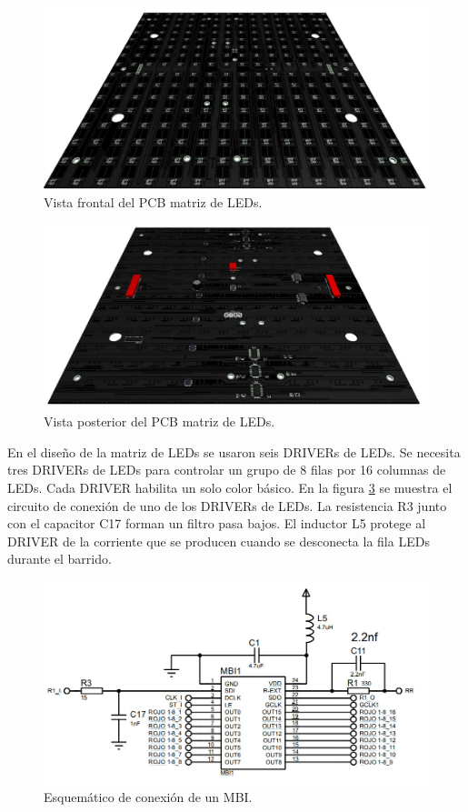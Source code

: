 \begin{figure}[htpb]
	\centering
	\includegraphics[scale=0.4]{Figures/pcbfullcolorfrontrender.jpg} 
	\caption{Vista frontal del PCB matriz de LEDs.}
	\label{fig:pcbrenderfront}
\end{figure}
\begin{figure}[htpb]
	\centering
	\includegraphics[scale=0.4]{Figures/pcbfullcolorbackrender.jpg} 
	\caption{Vista posterior del PCB matriz de LEDs.}
	\label{fig:pcbrenderback}
\end{figure}

En el diseño de la matriz de LEDs se usaron seis DRIVERs de LEDs. Se necesita tres DRIVERs de LEDs para controlar un grupo de 8 filas por 16 columnas de LEDs. Cada DRIVER habilita un solo color básico. En la figura \ref{fig:circuitombi} se muestra el circuito de conexión de uno de los DRIVERs de LEDs. La resistencia R3 junto con el capacitor C17 forman un filtro pasa bajos. El inductor L5 protege al DRIVER de la corriente que se producen cuando se desconecta la fila LEDs durante el barrido. 

\begin{figure}[htpb]
	\centering
    \includegraphics[scale=0.4]{Figures/circuitombi.jpg} 
	\caption{Esquemático de conexión de un MBI.}
	\label{fig:circuitombi}
\end{figure}



